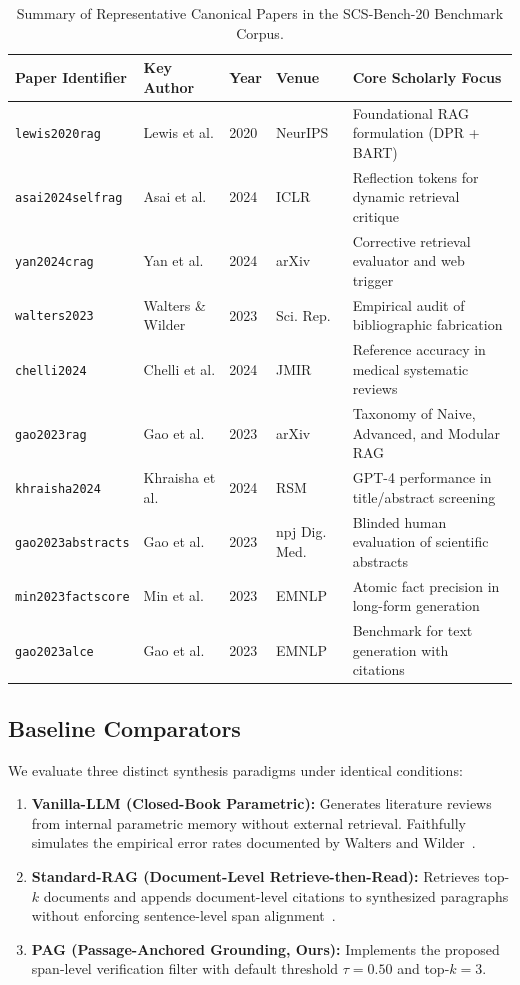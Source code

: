 \documentclass[acmsmall,screen]{acmart}
\begin{document}
\begin{table}[t]
\caption{Summary of Representative Canonical Papers in the SCS-Bench-20 Benchmark Corpus.}
\label{tab:corpus_summary}
\centering
\small
\begin{tabular}{lllll}
\toprule
\textbf{Paper Identifier} & \textbf{Key Author} & \textbf{Year} & \textbf{Venue} & \textbf{Core Scholarly Focus} \\
\midrule
\texttt{lewis2020rag} & Lewis et al. & 2020 & NeurIPS & Foundational RAG formulation (DPR + BART) \\
\texttt{asai2024selfrag} & Asai et al. & 2024 & ICLR & Reflection tokens for dynamic retrieval critique \\
\texttt{yan2024crag} & Yan et al. & 2024 & arXiv & Corrective retrieval evaluator and web trigger \\
\texttt{walters2023} & Walters \& Wilder & 2023 & Sci. Rep. & Empirical audit of bibliographic fabrication \\
\texttt{chelli2024} & Chelli et al. & 2024 & JMIR & Reference accuracy in medical systematic reviews \\
\texttt{gao2023rag} & Gao et al. & 2023 & arXiv & Taxonomy of Naive, Advanced, and Modular RAG \\
\texttt{khraisha2024} & Khraisha et al. & 2024 & RSM & GPT-4 performance in title/abstract screening \\
\texttt{gao2023abstracts} & Gao et al. & 2023 & npj Dig. Med. & Blinded human evaluation of scientific abstracts \\
\texttt{min2023factscore} & Min et al. & 2023 & EMNLP & Atomic fact precision in long-form generation \\
\texttt{gao2023alce} & Gao et al. & 2023 & EMNLP & Benchmark for text generation with citations \\
\bottomrule
\end{tabular}
\end{table}

\subsection{Baseline Comparators}
We evaluate three distinct synthesis paradigms under identical conditions:
\begin{enumerate}
    \item \textbf{Vanilla-LLM (Closed-Book Parametric):} Generates literature reviews from internal parametric memory without external retrieval. Faithfully simulates the empirical error rates documented by Walters and Wilder~\cite{walters2023}.
    \item \textbf{Standard-RAG (Document-Level Retrieve-then-Read):} Retrieves top-$k$ documents and appends document-level citations to synthesized paragraphs without enforcing sentence-level span alignment~\cite{lewis2020rag}.
    \item \textbf{PAG (Passage-Anchored Grounding, Ours):} Implements the proposed span-level verification filter with default threshold $\tau = 0.50$ and top-$k = 3$.
\end{enumerate}
\end{document}
